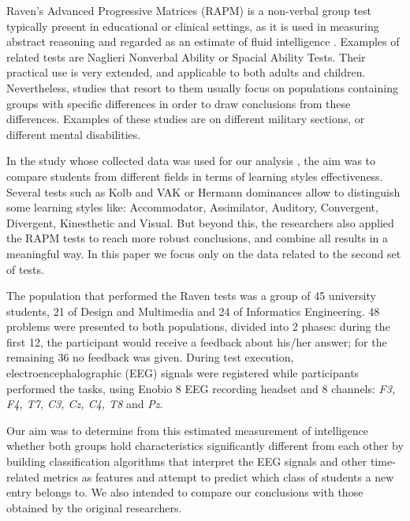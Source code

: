 \documentclass[extendedabs]{recpad2k}
\begin{document}
Raven's Advanced Progressive Matrices (RAPM) is a non-verbal group test typically present in educational or clinical settings, as it is used in measuring 
abstract reasoning and regarded as an estimate of fluid intelligence \cite{rapm}.
Examples of related tests are Naglieri Nonverbal Ability or Spacial Ability Tests.
Their practical use is very extended, and applicable to both adults and children.
Nevertheless, studies that resort to them usually focus on populations containing groups with specific differences in order to draw conclusions from these differences.
Examples of these studies are on different military sections, or different mental disabilities.

In the study whose collected data was used for our analysis \cite{study}, the aim was to compare students from different fields in terms of learning styles effectiveness.
Several tests such as Kolb and VAK or Hermann dominances allow to distinguish some learning styles like: Accommodator, Assimilator, Auditory, Convergent,
Divergent, Kinesthetic and Visual.
But beyond this, the researchers also applied the RAPM tests to reach more robust conclusions, and combine all results in a meaningful way.
In this paper we focus only on the data related to the second set of tests.

The population that performed the Raven tests was a group of 45 university students, 21 of Design and Multimedia and 24 of Informatics Engineering.
48 problems were presented to both populations, divided into 2 phases: during the first 12, the participant would receive a feedback about his/her answer; 
for the remaining 36 no feedback was given.
During test execution, electroencephalographic (EEG) signals were registered while participants performed the tasks, using Enobio 8 EEG recording headset and 8 
channels: \textit{F3, F4, T7, C3, Cz, C4, T8} and \textit{Pz}.

Our aim was to determine from this estimated measurement of intelligence whether both groups hold characteristics significantly different from each other by 
building classification algorithms that interpret the EEG signals and other time-related metrics as features and attempt to predict which class of students a 
new entry belongs to.
We also intended to compare our conclusions with those obtained by the original researchers.

\end{document}
